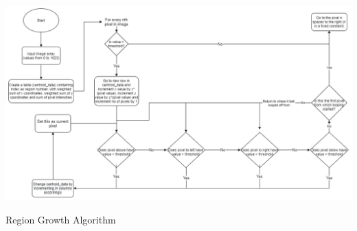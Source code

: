 \documentclass[../../main.tex]{subfiles}
\begin{document}
\begin{Flowchart}
    \centering
    \includegraphics[width = \textwidth]{Figures/Electrical/centroiding_4_non_coding.png}
    \caption{Region Growth Algorithm}
    \label{FC:flow_fe_rga}
\end{Flowchart}
\end{document}
